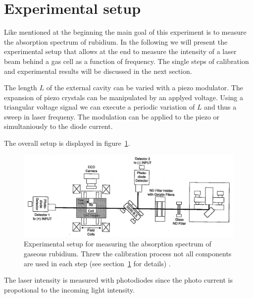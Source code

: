 \section{Experimental setup}
Like mentioned at the beginning the main goal of this experiment is to measure the absorption spectrum of rubidium.
In the following we will present the experimental setup that allows at the end to measure the intensity of a laser beam
behind a gas cell as a function of frequency. The single steps of calibration and experimental results will be discussed
in the next section.

The length $L$ of the external cavity can be varied with a piezo modulator. The expansion of piezo crystals can be manipulated by an
applyed voltage. Using a triangular voltage signal we can execute a periodic variation of $L$ and thus a sweep in laser frequeny. The
modulation can be applied to the piezo or simultaniously to the diode current.

The overall setup is displayed in figure~\ref{fig: setup}.

\begin{figure}
\centering
\includegraphics[width = \textwidth]{pics/setup.png}
\caption{Experimental setup for measuring the absorption spectrum of gaseous rubidium. Threw the calibration 
process not all components are used in each step (see section~\ref{} for details) \cite{anleitung60}. }
\label{fig: setup}
\end{figure}


The laser intensity is measured with photodiodes since the photo current
is propotional to the incoming light intensity.
